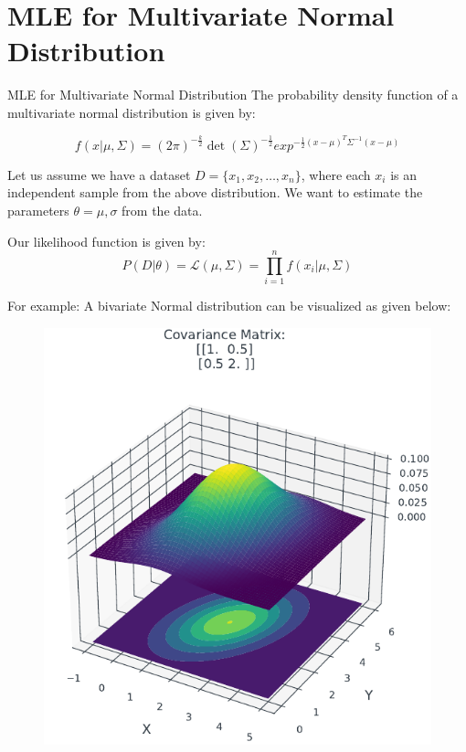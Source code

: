 \documentclass[handout]{beamer}
\begin{document}
\section{MLE for Multivariate Normal Distribution}
\begin{frame}{MLE for Multivariate Normal Distribution}
The probability density function of a multivariate normal distribution is given by:

\begin{equation}
f(x|\mu, \Sigma) = (2\pi)^{-\frac{k}{2}}\det(\Sigma)^{-\frac{1}{2}}exp^{-\frac{1}{2}(x-\mu)^{T}\Sigma^{-1}(x-\mu)}
\end{equation}

Let us assume we have a dataset $D = \{x_1, x_2, \ldots, x_n\}$, where each $x_i$ is an independent sample from the above distribution.
We want to estimate the parameters $\theta = {\mu, \sigma}$ from the data.

Our likelihood function is given by:
\begin{equation}
P(D|\theta) = \mathcal{L}(\mu, \Sigma) = \prod_{i=1}^n f(x_i|\mu, \Sigma)
\end{equation}

\end{frame}

\begin{frame}
    For example: A bivariate Normal distribution can be visualized as given below:
    \begin{figure}
                \centerline{\includegraphics[scale = 0.75]{../figures/mle/bivariate_normal.pdf}}
\end{figure}
    
\end{frame}
\end{document}
